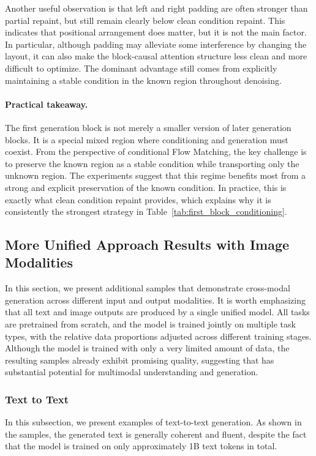 Another useful observation is that left and right padding are often stronger than partial repaint, but still remain clearly below clean condition repaint. This indicates that positional arrangement does matter, but it is not the main factor. In particular, although padding may alleviate some interference by changing the layout, it can also make the block-causal attention structure less clean and more difficult to optimize. The dominant advantage still comes from explicitly maintaining a stable condition in the known region throughout denoising.

\paragraph{Practical takeaway.}
The first generation block is not merely a smaller version of later generation blocks. It is a special mixed region where conditioning and generation must coexist. From the perspective of conditional Flow Matching, the key challenge is to preserve the known region as a stable condition while transporting only the unknown region. The experiments suggest that this regime benefits most from a strong and explicit preservation of the known condition. In practice, this is exactly what clean condition repaint provides, which explains why it is consistently the strongest strategy in Table~\ref{tab:first_block_conditioning}.

\subsection{More Unified Approach Results with Image Modalities}
\label{app:unified_results}
In this section, we present additional samples that demonstrate cross-modal generation across different input and output modalities. It is worth emphasizing that all text and image outputs are produced by a single unified model. All tasks are pretrained from scratch, and the model is trained jointly on multiple task types, with the relative data proportions adjusted across different training stages. Although the model is trained with only a very limited amount of data, the resulting samples already exhibit promising quality, suggesting that \method has substantial potential for multimodal understanding and generation.

\subsubsection{Text to Text}
In this subsection, we present examples of text-to-text generation. As shown in the samples, the generated text is generally coherent and fluent, despite the fact that the model is trained on only approximately 1B text tokens in total.

